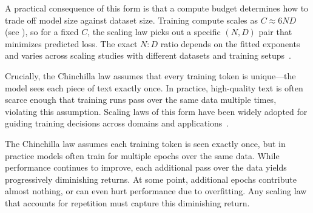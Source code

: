 A practical consequence of this form is that a compute budget determines how to trade off model size against dataset size. Training compute scales as $C \approx 6ND$ (see \citep{kaplan2020scaling}), so for a fixed $C$, the scaling law picks out a specific $(N, D)$ pair that minimizes predicted loss. The exact $N:D$ ratio depends on the fitted exponents and varies across scaling studies with different datasets and training setups~\citep{li2025misfitting}. 

Crucially, the Chinchilla law assumes that every training token is unique---the model sees each piece of text exactly once. In practice, high-quality text is often scarce enough that training runs pass over the same data multiple times, violating this assumption. Scaling laws of this form have been widely adopted for guiding training decisions across domains and applications~\citep{ludziejewski2024scaling, gulrajani2023likelihood, cherti2023reproducible, kumar2025scaling, aghajanyan2023scaling, sardana2024beyond, gadre2025language}.

The Chinchilla law assumes each training token is seen exactly once, but in practice models often train for multiple epochs over the same data. While performance continues to improve, each additional pass over the data  yields progressively diminishing returns. At some point, additional epochs contribute almost nothing, or can even hurt performance due to overfitting. Any scaling law that accounts for repetition must capture this diminishing return.

